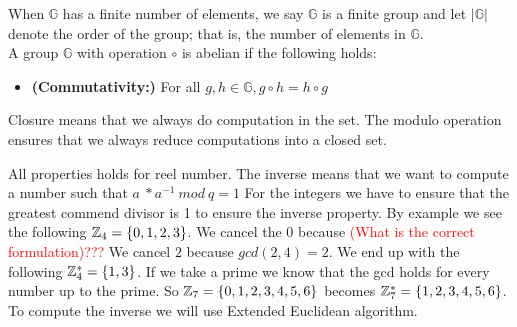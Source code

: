 \begin{defi}
\begin{itemize}
\end{itemize}
When \begin{math}\mathbb{G}\end{math} has a finite number of elements, we say \begin{math}\mathbb{G}\end{math} is a finite group and let
\begin{math}| \mathbb{G}|\end{math} denote the order of the group; that is, the number of elements in \begin{math}\mathbb{G}\end{math}. \\
A group \begin{math}\mathbb{G}\end{math} with operation \begin{math}\circ\end{math} is abelian if the following holds:
\begin{itemize}
\item \textnormal{\textbf{(Commutativity:)}} For all \begin{math}g, h \in \mathbb{G}, g \circ h = h \circ g \end{math}
\end{itemize}
\end{defi}

 Closure means that we always do computation in the set. The modulo operation ensures that we always reduce computations into a closed set.

 All properties holds for reel number. The inverse means that we want to compute a number such that \begin{math}a\ * a^{-1} \ mod \ q = 1 \end{math}  For the integers we have to ensure that the greatest commend divisor is 1 to ensure the inverse property. By example we see the following \begin{math} \mathbb{Z}_4 = \{0,1,2,3\}\end{math}. We cancel the \begin{math}0\end{math} because \textcolor{red}{(What is the correct formulation)???} We cancel \begin{math}2\end{math} because \begin{math}gcd(2,4)=2\end{math}. We end up with the following \begin{math} \mathbb{Z}_4^* = \{1,3\}\end{math}. If we take a prime we know that the gcd holds for every number up to the prime. So  \begin{math} \mathbb{Z}_7 = \{0,1,2,3,4,5,6\}\end{math} becomes \begin{math} \mathbb{Z}_7^* = \{1,2,3,4,5,6\}\end{math}. To compute the inverse we will use Extended Euclidean algorithm.


